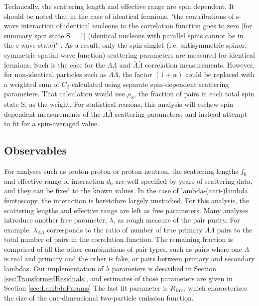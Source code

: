 Technically, the scattering length and effective range are spin dependent.  
It should be noted that in the case of identical fermions, "the contributions of s-wave interaction of identical nucleons to the correlation function goes to zero [for summary spin state S = 1] (identical nucleons with parallel spins cannot be in the s-wave state)" \cite{lednicky82}.  
As a result, only the spin singlet (i.e. antisymmetric spinor, symmetric spatial wave function) scattering parameters are measured for identical fermions.  
Such is the case for the $\Lambda\Lambda$ and $\bar{\Lambda}\bar{\Lambda}$ correlation measurements.  
However, for non-identical particles such as $\Lambda\bar{\Lambda}$, the factor $(1+\alpha)$ could be replaced with a weighted sum of $C_2$ calculated using separate spin-dependent scattering parameters.  
That calculation would use $\rho_S$, the fraction of pairs in each total spin state S, as the weight.  
For statistical reasons, this analysis will eschew spin-dependent measurements of the $\Lambda\bar{\Lambda}$ scattering parameters, and instead attempt to fit for a spin-averaged value.


\subsection{Observables}
\label{sec:Observables}
For analyses such as proton-proton or proton-neutron, the scattering lengths $f_0$ and effective range of interaction $d_0$ are well specified by years of scattering data, and they can be fixed to the known values.  
In the case of lambda-(anti-)lambda femtoscopy, the interaction is heretofore largely unstudied.  
For this analysis, the scattering lengths and effective range are left as free parameters.  
Many analyses introduce another free parameter, $\lambda$, as rough measure of the pair purity.  
For example, $\lambda_{\Lambda\Lambda}$ corresponds to the ratio of number of true primary $\Lambda\Lambda$ pairs to the total number of pairs in the correlation function. 
The remaining fraction is comprised of all the other combinations of pair types, such as pairs where one $\Lambda$ is real and primary and the other is fake, or pairs between primary and secondary lambdas.  
Our implementation of $\lambda$ parameters is described in Section \ref{sec:TransformedResiduals}, and estimates of those parameters are given in Section \ref{sec:LambdaParams}
The last fit parameter is $R_{\rm inv}$, which characterizes the size of the one-dimensional two-particle emission function.


